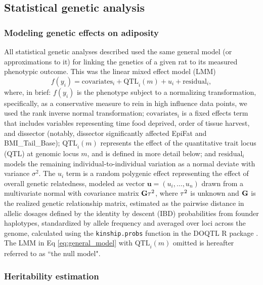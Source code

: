 \subsection{Statistical genetic analysis}

\subsubsection{Modeling genetic effects on adiposity} 

All statistical genetic analyses described used the same general model (or approximations to it) for linking the genetics of a given rat  to its measured phenotypic outcome. This was the linear mixed effect model (LMM)
\begin{equation}
	f(y_{i}) = \text{covariates}_{i} + \text{QTL}_{i}(m) + u_{i} + \text{residual}_{i}, \label{eq:general_model}
\end{equation}
where, in brief: $f(y_{i})$ is the phenotype subject to a normalizing transformation, specifically, as a conservative measure to rein in high influence data points, we used the rank inverse normal transformation; $\text{covariates}_{i}$ is a fixed effects term that includes variables representing time food deprived, order of tissue harvest, and dissector (notably, dissector significantly affected EpiFat and BMI\_Tail\_Base); $\text{QTL}_{i}(m)$ represents the effect of the quantitative trait locus (QTL) at genomic locus $m$, and is defined in more detail below; and $\text{residual}_{i}$ models the remaining individual-to-individual variation as a normal deviate with variance $\sigma^{2}$. The $u_{i}$ term is a random polygenic effect representing the effect of overall genetic relatedness, modeled as vector $\mathbf{u} = (u_{i}, \ldots, u_{n})$ drawn from a multivariate normal with covariance matrix $\mathbf{G}\tau^{2}$, where $\tau^{2}$ is unknown and $\mathbf{G}$ is the realized genetic relationship matrix, estimated as the pairwise distance in allelic dosages defined by the identity by descent (IBD) probabilities from founder haplotypes, standardized by allele frequency and averaged over loci across the genome, calculated using the \texttt{kinship.probs} function in the DOQTL R package \citep{Gatti2014}. The LMM in Eq \ref{eq:general_model} with $\text{QTL}_{i}(m)$ omitted is hereafter referred to as ``the null model".

\subsubsection{Heritability estimation}

